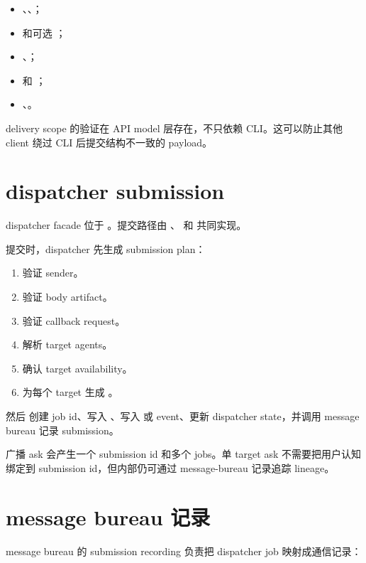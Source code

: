 \begin{itemize}
  \item {}、、；
  \item {} 和可选 ；
  \item {}、；
  \item {} 和 ；
  \item {}、。
\end{itemize}

delivery scope 的验证在 API model 层存在，不只依赖 CLI。这可以防止其他 client 绕过 CLI 后提交结构不一致的 payload。

\section{dispatcher submission}

dispatcher facade 位于 。提交路径由 、 和  共同实现。

提交时，dispatcher 先生成 submission plan：

\begin{enumerate}
  \item 验证 sender。
  \item 验证 body artifact。
  \item 验证 callback request。
  \item 解析 target agents。
  \item 确认 target availability。
  \item 为每个 target 生成 。
\end{enumerate}

然后  创建 job id、写入 、写入  或  event、更新 dispatcher state，并调用 message bureau 记录 submission。

广播 ask 会产生一个 submission id 和多个 jobs。单 target ask 不需要把用户认知绑定到 submission id，但内部仍可通过 message-bureau 记录追踪 lineage。

\section{message bureau 记录}

message bureau 的 submission recording 负责把 dispatcher job 映射成通信记录：

